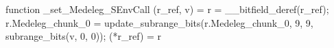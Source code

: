 function _set_Medeleg_SEnvCall (r_ref, v) = {
    r = __bitfield_deref(r_ref);
    r.Medeleg_chunk_0 = update_subrange_bits(r.Medeleg_chunk_0, 9, 9, subrange_bits(v, 0, 0));
    (*r_ref) = r
}
